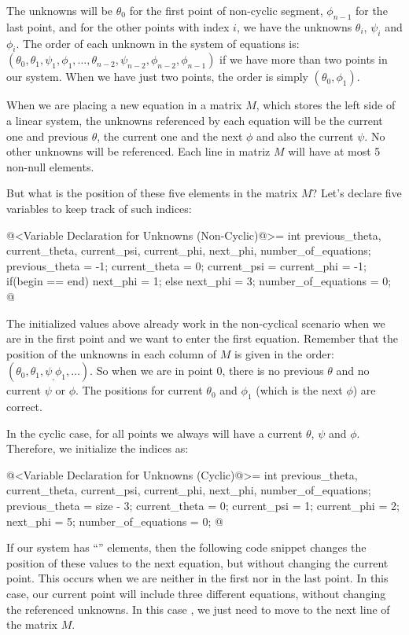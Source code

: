 The unknowns will be $\theta_0$ for the first point of non-cyclic
segment, $\phi_{n-1}$ for the last point, and for the other points
with index $i$, we have the unknowns $\theta_i$, $\psi_i$ and
$\phi_i$. The order of each unknown in the system of equations is:
$(\theta_0, \theta_1, \psi_1, \phi_1, \ldots, \theta_{n-2}, \psi_{n-2}, \phi_{n-2}, \phi_{n-1})$
if we have more than two points in our system. When we have just two points, the order is simply $(\theta_0, \phi_1)$.

When we are placing a new equation in a matrix $M$, which stores the
left side of a linear system, the unknowns referenced by each equation
will be the current one and previous $\theta$, the current one and the
next $\phi$ and also the current $\psi$. No other unknowns will be
referenced. Each line in matriz $M$ will have at most 5 non-null
elements.

But what is the position of these five elements in the matrix $M$?
Let's declare five variables to keep track of such indices:

\iniciocodigo
@<Variable Declaration for Unknowns (Non-Cyclic)@>=
int previous_theta, current_theta, current_psi, current_phi, next_phi,
    number_of_equations;
previous_theta = -1;
current_theta = 0;
current_psi = current_phi = -1;
if(begin == end)
  next_phi = 1;
else
  next_phi = 3;
number_of_equations = 0;
@
\fimcodigo

The initialized values ​​above already work in the non-cyclical
scenario when we are in the first point and we want to enter the first
equation. Remember that the position of the unknowns in each column of
$M$ is given in the order:
$(\theta_0, \theta_1, \psi_, \phi_1, \ldots)$. So when we are in point
0, there is no previous $\theta$ and no current $\psi$ or $\phi$. The
positions for current $\theta_0$ and $\phi_1$ (which is the next
$\phi$) are correct.

In the cyclic case, for all points we always will have a current
$\theta$, $\psi$ and $\phi$. Therefore, we initialize the indices as:

\iniciocodigo
@<Variable Declaration for Unknowns (Cyclic)@>=
int previous_theta, current_theta, current_psi, current_phi, next_phi,
    number_of_equations;
previous_theta = size - 3;
current_theta = 0;
current_psi = 1;
current_phi = 2;
next_phi = 5;
number_of_equations = 0;
@
\fimcodigo

If our system has ``'' elements, then the following
code snippet changes the position of these values to the next
equation, but without changing the current point. This occurs when we
are neither in the first nor in the last point. In this case, our
current point will include three different equations, without changing
the referenced unknowns. In this case , we just need to move to the
next line of the matrix $M$.

